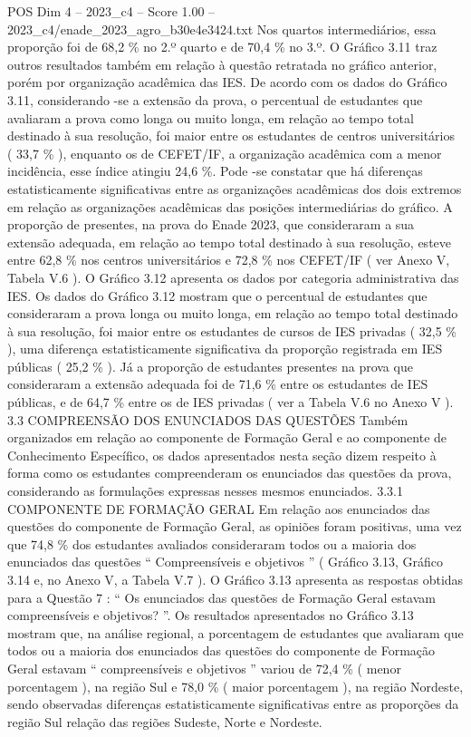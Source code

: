 \begin{textsample}{POS Dim 4 – 2023\_c4 – Score 1.00 – 2023\_c4/enade\_2023\_agro\_b30e4e3424.txt}
Nos quartos intermediários, essa proporção foi de 68,2 \% no 2.º quarto e de 70,4 \% no 3.º.
O Gráfico 3.11 traz outros resultados também em relação à questão retratada no gráfico anterior, porém por organização acadêmica das IES.
De acordo com os dados do Gráfico 3.11, considerando -se a extensão da prova, o percentual de estudantes que avaliaram a prova como longa ou muito longa, em relação ao tempo total destinado à sua resolução, foi maior entre os estudantes de centros universitários ( 33,7 \% ), enquanto os de CEFET/IF, a organização acadêmica com a menor incidência, esse índice atingiu 24,6 \%.
Pode -se constatar que há diferenças estatisticamente significativas entre as organizações acadêmicas dos dois extremos em relação as organizações acadêmicas das posições intermediárias do gráfico.
A proporção de presentes, na prova do Enade 2023, que consideraram a sua extensão adequada, em relação ao tempo total destinado à sua resolução, esteve entre 62,8 \% nos centros universitários e 72,8 \% nos CEFET/IF ( ver Anexo V, Tabela V.6 ).
O Gráfico 3.12 apresenta os dados por categoria administrativa das IES.
Os dados do Gráfico 3.12 mostram que o percentual de estudantes que consideraram a prova longa ou muito longa, em relação ao tempo total destinado à sua resolução, foi maior entre os estudantes de cursos de IES privadas ( 32,5 \% ), uma diferença estatisticamente significativa da proporção registrada em IES públicas ( 25,2 \% ).
Já a proporção de estudantes presentes na prova que consideraram a extensão adequada foi de 71,6 \% entre os estudantes de IES públicas, e de 64,7 \% entre os de IES privadas ( ver a Tabela V.6 no Anexo V ). 3.3 COMPREENSÃO DOS ENUNCIADOS DAS QUESTÕES Também organizados em relação ao componente de Formação Geral e ao componente de Conhecimento Específico, os dados apresentados nesta seção dizem respeito à forma como os estudantes compreenderam os enunciados das questões da prova, considerando as formulações expressas nesses mesmos enunciados. 3.3.1 COMPONENTE DE FORMAÇÃO GERAL Em relação aos enunciados das questões do componente de Formação Geral, as opiniões foram positivas, uma vez que 74,8 \% dos estudantes avaliados consideraram todos ou a maioria dos enunciados das questões “ Compreensíveis e objetivos ” ( Gráfico 3.13, Gráfico 3.14 e, no Anexo V, a Tabela V.7 ).
O Gráfico 3.13 apresenta as respostas obtidas para a Questão 7 : “ Os enunciados das questões de Formação Geral estavam compreensíveis e objetivos? ”.
Os resultados apresentados no Gráfico 3.13 mostram que, na análise regional, a porcentagem de estudantes que avaliaram que todos ou a maioria dos enunciados das questões do componente de Formação Geral estavam “ compreensíveis e objetivos ” variou de 72,4 \% ( menor porcentagem ), na região Sul e 78,0 \% ( maior porcentagem ), na região Nordeste, sendo observadas diferenças estatisticamente significativas entre as proporções da região Sul relação das regiões Sudeste, Norte e Nordeste.

\end{textsample}
